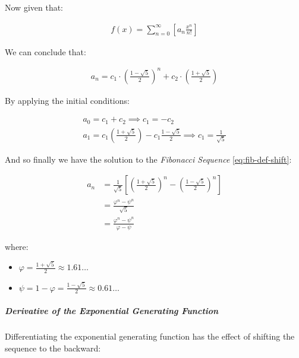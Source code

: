 \documentclass[11pt]{article}
\begin{document}
Now given that:


\begin{align*}
f\left( x \right)= \sum^{\infty}_{n= 0}   \left[ a_n \frac{x^n}{n!} \right]
\end{align*}


We can conclude that:


\begin{align*}
a_n = c_1\cdot  \left( \frac{1- \sqrt{5} }{2} \right)^n +  c_2 \cdot  \left( \frac{1+  \sqrt{5} }{2} \right)
\end{align*}


By applying the initial conditions:


\begin{align*}
a_0= c_1 +  c_2  \implies  c_1= - c_2\\
a_1= c_1 \left( \frac{1+ \sqrt{5} }{2} \right) -  c_1 \frac{1-\sqrt{5} }{2}  \implies  c_1 = \frac{1}{\sqrt{5} }
\end{align*}


And so finally we have the solution to the \emph{Fibonacci Sequence} \ref{eq:fib-def-shift}:


\begin{align}
    a_n &= \frac{1}{\sqrt{5} } \left[ \left( \frac{1+  \sqrt{5} }{2}  \right)^n -  \left( \frac{1- \sqrt{5} }{2} \right)^n \right] \nonumber \\
&= \frac{\varphi^n - \psi^n}{\sqrt{5} } \nonumber\\
&=\frac{\varphi^n -  \psi^n}{\varphi - \psi} \label{eq:fib-sol}
\end{align}


where:

\begin{itemize}
\item \(\varphi = \frac{1+ \sqrt{5} }{2} \approx 1.61\ldots\)
\item \(\psi = 1-\varphi = \frac{1- \sqrt{5} }{2} \approx 0.61\ldots\)
\end{itemize}

\subparagraph{Derivative of the Exponential Generating Function}
\label{Derivative-exp-gen-function}
Differentiating the exponential generating function has the effect of shifting the sequence to the backward: \cite{lehmanReadingsMathematicsComputer2010}
\end{document}
